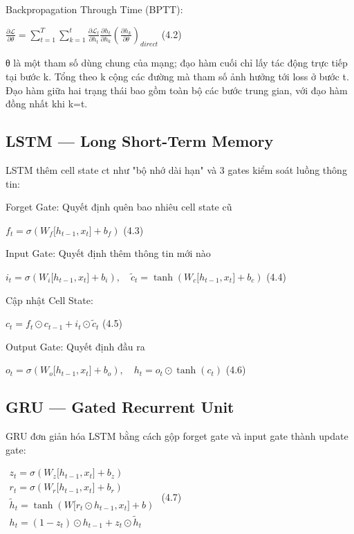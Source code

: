 Backpropagation Through Time (BPTT):

\(\frac{\partial\mathcal{L}}{\partial\theta} = \sum_{t = 1}^{T}{\sum_{k = 1}^{t}\frac{\partial\mathcal{L}_{t}}{\partial h_{t}}}\frac{\partial h_{t}}{\partial h_{k}}\left( \frac{\partial h_{k}}{\partial\theta} \right)_{direct}\)
(4.2)

θ là một tham số dùng chung của mạng; đạo hàm cuối chỉ lấy tác động trực
tiếp tại bước k. Tổng theo k cộng các đường mà tham số ảnh hưởng tới
loss ở bước t. Đạo hàm giữa hai trạng thái bao gồm toàn bộ các bước
trung gian, với đạo hàm đồng nhất khi k=t.

\subsection{LSTM --- Long Short-Term Memory}\label{LSTM-long-short-term-memory}

LSTM thêm cell state ct như "bộ nhớ dài hạn" và 3 gates kiểm soát luồng
thông tin:

Forget Gate: Quyết định quên bao nhiêu cell state cũ

\(f_{t} = \sigma(W_{f}\lbrack h_{t - 1},x_{t}\rbrack + b_{f})\) (4.3)

Input Gate: Quyết định thêm thông tin mới nào

\(i_{t} = \sigma(W_{i}\lbrack h_{t - 1},x_{t}\rbrack + b_{i}),\quad{\tilde{c}}_{t} = \tanh(W_{c}\lbrack h_{t - 1},x_{t}\rbrack + b_{c})\)
(4.4)

Cập nhật Cell State:

\(c_{t} = f_{t} \odot c_{t - 1} + i_{t} \odot {\tilde{c}}_{t}\) (4.5)

Output Gate: Quyết định đầu ra

\(o_{t} = \sigma(W_{o}\lbrack h_{t - 1},x_{t}\rbrack + b_{o}),\quad h_{t} = o_{t} \odot \tanh(c_{t})\)
(4.6)

\subsection{GRU --- Gated Recurrent Unit}\label{GRU-gated-recurrent-unit}

GRU đơn giản hóa LSTM bằng cách gộp forget gate và input gate thành
update gate:

\(\begin{array}{r}
z_{t} = \sigma(W_{z}\lbrack h_{t - 1},x_{t}\rbrack + b_{z}) \\
r_{t} = \sigma(W_{r}\lbrack h_{t - 1},x_{t}\rbrack + b_{r}) \\
{\tilde{h}}_{t} = \tanh(W\lbrack r_{t} \odot h_{t - 1},x_{t}\rbrack + b) \\
h_{t} = (1 - z_{t}) \odot h_{t - 1} + z_{t} \odot {\tilde{h}}_{t}
\end{array}\) (4.7)

